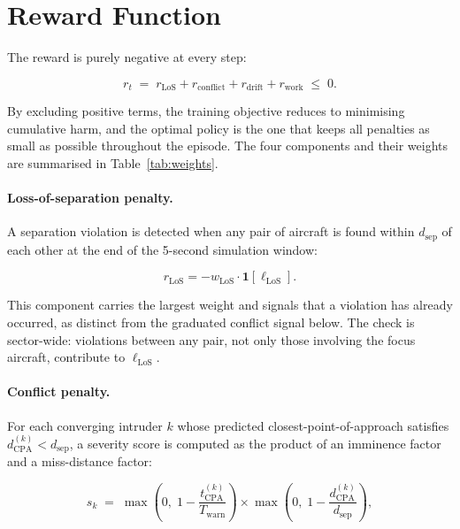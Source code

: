 \documentclass[11pt, a4paper]{article}
\begin{document}
\section{Reward Function}
\label{sec:reward}

The reward is purely negative at every step:

\begin{equation}
    r_t \;=\; r_\text{LoS} + r_\text{conflict} + r_\text{drift} + r_\text{work}
    \;\leq\; 0.
    \label{eq:reward}
\end{equation}

By excluding positive terms, the training objective reduces to minimising
cumulative harm, and the optimal policy is the one that keeps all penalties
as small as possible throughout the episode.
The four components and their weights are summarised in
Table~\ref{tab:weights}.

\paragraph{Loss-of-separation penalty.}
A separation violation is detected when any pair of aircraft is found within
$d_\text{sep}$ of each other at the end of the 5-second simulation window:

\begin{equation}
    r_\text{LoS} = -w_\text{LoS} \cdot \mathbf{1}[\ell_\text{LoS}].
\end{equation}

This component carries the largest weight and signals that a violation
has already occurred, as distinct from the graduated conflict signal below.
The check is sector-wide: violations between any pair, not only those
involving the focus aircraft, contribute to $\ell_\text{LoS}$.

\paragraph{Conflict penalty.}
For each converging intruder $k$ whose predicted closest-point-of-approach
satisfies $d_\text{CPA}^{(k)} < d_\text{sep}$, a severity score is
computed as the product of an imminence factor and a miss-distance factor:

\begin{equation}
    s_k \;=\; \max\!\left(0,\;1 - \frac{t_\text{CPA}^{(k)}}{T_\text{warn}}\right)
             \times
             \max\!\left(0,\;1 - \frac{d_\text{CPA}^{(k)}}{d_\text{sep}}\right),
    \label{eq:score}
\end{equation}
\end{document}
